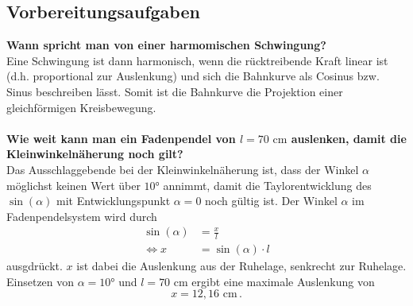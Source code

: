 \subsection{Vorbereitungsaufgaben}
\label{sec:Vorbereitungsaufgaben}
\textbf{Wann spricht man von einer harmomischen Schwingung?}\\
Eine Schwingung ist dann harmonisch, wenn die rücktreibende Kraft linear ist (d.h. proportional zur Auslenkung) und sich die Bahnkurve als 
Cosinus bzw. Sinus beschreiben lässt. Somit ist die Bahnkurve die Projektion einer gleichförmigen Kreisbewegung. 
\\
\\
\textbf{Wie weit kann man ein Fadenpendel von $l = 70 \,\,\unit{\centi\meter}$ auslenken, damit die Kleinwinkelnäherung noch gilt?}\\
Das Ausschlaggebende bei der Kleinwinkelnäherung ist, dass der Winkel $\alpha$ möglichst keinen Wert über $10°$ annimmt,
damit die Taylorentwicklung des $\sin(\alpha)$ mit Entwicklungspunkt $\alpha = 0$ noch gültig ist. 
Der Winkel $\alpha$ im Fadenpendelsystem wird durch
\begin{align*}
    \sin(\alpha) &= \frac{x}{l} \\
    \Leftrightarrow x &= \sin(\alpha) \cdot l
\end{align*}
ausgdrückt. $x$ ist dabei die Auslenkung aus der Ruhelage, senkrecht zur Ruhelage. \\
Einsetzen von $\alpha = 10°$ und $l = 70 \,\, \unit{\centi\meter}$ ergibt eine maximale Auslenkung von $$x = 12,16 \,\, \unit{\centi\meter}\,.$$



